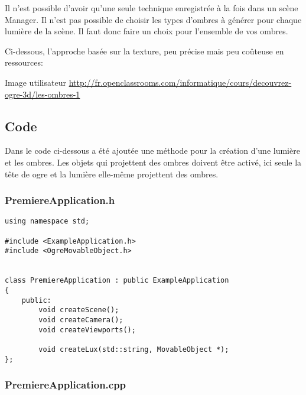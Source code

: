 Il n'est possible d'avoir qu'une seule technique enregistrée à la fois dans un scène Manager. Il n'est pas possible de choisir les types d'ombres à générer pour chaque lumière de la scène. Il faut donc faire un choix pour l'ensemble de vos ombres.

Ci-dessous, l'approche basée sur la texture, peu précise mais peu coûteuse en ressources:

Image utilisateur \url{http://fr.openclassrooms.com/informatique/cours/decouvrez-ogre-3d/les-ombres-1}



\subsection{Code}
Dans le code ci-dessous a été ajoutée une méthode pour la création d'une lumière et les ombres. Les objets qui projettent des ombres doivent être activé, ici seule la tête de ogre et la lumière elle-même projettent des ombres.

\subsubsection{PremiereApplication.h}



\begin{lstlisting}[caption={PremiereApplication.h: ajout d'une méthode pour la gestion de lumière et des ombres}]
using namespace std;

#include <ExampleApplication.h>
#include <OgreMovableObject.h>


class PremiereApplication : public ExampleApplication
{
    public:
        void createScene();
        void createCamera();
        void createViewports();

        void createLux(std::string, MovableObject *);
};

\end{lstlisting}







\subsubsection{PremiereApplication.cpp}




